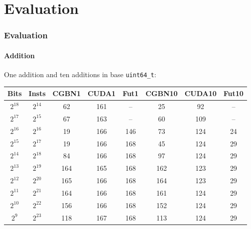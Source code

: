 \section{Evaluation}
\begin{frame}[fragile]
  \frametitle{Evaluation}
  \framesubtitle{Addition}
  One addition and ten additions in base \texttt{uint64\_t}:\newline
  \begin{center}\scriptsize
  \begin{tabular}{|c|c||c|c|c||c|c|c|}\hline
    Bits & I{\tiny nsts} & CGBN1 & CUDA1 & Fut1 & CGBN10 & CUDA10 & Fut10 \\\hline\hline
    $2^{18}$ & $2^{14}$ & 62  & 161 & --   & 25  & 92  & --  \\\hline
    $2^{17}$ & $2^{15}$ & 67  & 163 & --   & 60  & 109 & --  \\\hline
    $2^{16}$ & $2^{16}$ & 19  & 166 & 146 & 73  & 124 & 24 \\\hline
    $2^{15}$ & $2^{17}$ & 19  & 166 & 168 & 45  & 124 & 29 \\\hline
    $2^{14}$ & $2^{18}$ & 84  & 166 & 168 & 97  & 124 & 29 \\\hline
    $2^{13}$ & $2^{19}$ & 164 & 165 & 168 & 162 & 123 & 29 \\\hline
    $2^{12}$ & $2^{20}$ & 165 & 166 & 168 & 164 & 123 & 29 \\\hline
    $2^{11}$ & $2^{21}$ & 164 & 166 & 168 & 161 & 124 & 29 \\\hline
    $2^{10}$ & $2^{22}$ & 156 & 166 & 168 & 152 & 124 & 29 \\\hline
    $2^{9}$  & $2^{23}$ & 118 & 167 & 168 & 113 & 124 & 29 \\\hline
  \end{tabular}
  \end{center}
\end{frame}


